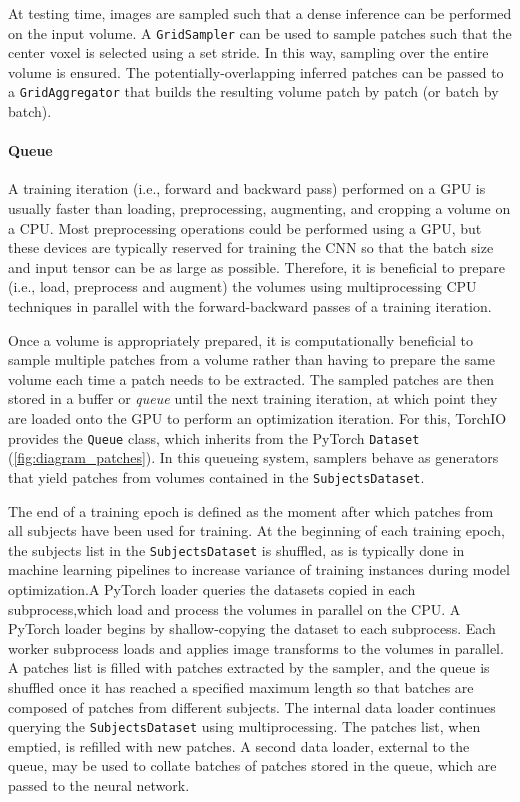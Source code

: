 At testing time, images are sampled such that a dense inference can be performed on the input volume.
A \texttt{GridSampler} can be used to sample patches such that the center voxel is selected using a set stride.
In this way, sampling over the entire volume is ensured.
The potentially-overlapping inferred patches can be passed to a \texttt{GridAggregator} that builds the resulting volume patch by patch (or batch by batch).


\paragraph{Queue}

A training iteration (i.e., forward and backward pass) performed on a \ac{GPU} is usually faster than loading, preprocessing, augmenting, and cropping a volume on a \ac{CPU}.
Most preprocessing operations could be performed using a \ac{GPU}, but these devices are typically reserved for training the \ac{CNN} so that the batch size and input tensor can be as large as  possible.
Therefore, it is beneficial to prepare (i.e., load, preprocess and augment) the volumes using multiprocessing \ac{CPU} techniques in parallel with the forward-backward passes of a training iteration.

Once a volume is appropriately prepared, it is computationally beneficial to sample multiple patches from a volume rather than having to prepare the same volume each time a patch needs to be extracted.
The sampled patches are then stored in a buffer or \textit{queue} until the next training iteration, at which point they are loaded onto the \ac{GPU} to perform an optimization iteration.
For this, TorchIO provides the \texttt{Queue} class, which inherits from the PyTorch \texttt{Dataset} (\cref{fig:diagram_patches}).
In this queueing system, samplers behave as generators that yield patches from volumes contained in the \texttt{SubjectsDataset}.

The end of a training epoch is defined as the moment after which patches from all subjects have been used for training.
At the beginning of each training epoch, the subjects list in the \texttt{SubjectsDataset} is shuffled, as is typically done in machine learning pipelines to increase variance of training instances during model optimization.A PyTorch loader queries the datasets copied in each subprocess,which load and process the volumes in parallel on the \ac{CPU}.
A PyTorch loader begins by shallow-copying the dataset to each subprocess.
Each worker subprocess loads and applies image transforms to the volumes in parallel.
A patches list is filled with patches extracted by the sampler, and the queue is shuffled once it has reached a specified maximum length so that batches are composed of patches from different subjects.
The internal data loader continues querying the \texttt{SubjectsDataset} using multiprocessing.
The patches list, when emptied, is refilled with new patches.
A second data loader, external to the queue, may be used to collate batches of patches stored in the queue, which are passed to the neural network.
